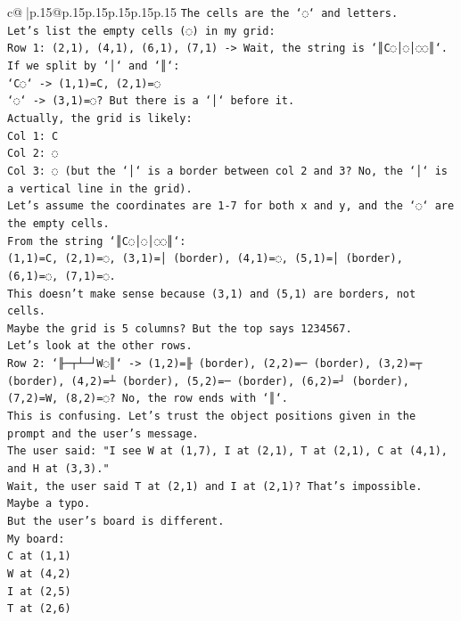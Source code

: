 \documentclass{article}
\begin{document}
{\begin{supertabular}{c@{$\;$}|p{.15\linewidth}@{}p{.15\linewidth}p{.15\linewidth}p{.15\linewidth}p{.15\linewidth}p{.15\linewidth}}
{{{\texttt{The cells are the `◌` and letters.} \\
\texttt{Let's list the empty cells (◌) in my grid:} \\
\texttt{Row 1: (2,1), (4,1), (6,1), (7,1) {-}> Wait, the string is `║C◌│◌│◌◌║`.} \\
\texttt{If we split by `│` and `║`:} \\
\texttt{`C◌` {-}> (1,1)=C, (2,1)=◌} \\
\texttt{`◌` {-}> (3,1)=◌? But there is a `│` before it.} \\
\texttt{Actually, the grid is likely:} \\
\texttt{Col 1: C} \\
\texttt{Col 2: ◌} \\
\texttt{Col 3: ◌ (but the `│` is a border between col 2 and 3? No, the `│` is a vertical line in the grid).} \\
\texttt{Let's assume the coordinates are 1{-}7 for both x and y, and the `◌` are the empty cells.} \\
\texttt{From the string `║C◌│◌│◌◌║`:} \\
\texttt{(1,1)=C, (2,1)=◌, (3,1)=│ (border), (4,1)=◌, (5,1)=│ (border), (6,1)=◌, (7,1)=◌.} \\
\texttt{This doesn't make sense because (3,1) and (5,1) are borders, not cells.} \\
\texttt{Maybe the grid is 5 columns? But the top says 1234567.} \\
\texttt{Let's look at the other rows.} \\
\texttt{Row 2: `╟─┬┴─┘W◌║` {-}> (1,2)=╟ (border), (2,2)=─ (border), (3,2)=┬ (border), (4,2)=┴ (border), (5,2)=─ (border), (6,2)=┘ (border), (7,2)=W, (8,2)=◌? No, the row ends with `║`.} \\
\texttt{This is confusing. Let's trust the object positions given in the prompt and the user's message.} \\
\texttt{The user said: "I see W at (1,7), I at (2,1), T at (2,1), C at (4,1), and H at (3,3)."} \\
\texttt{Wait, the user said T at (2,1) and I at (2,1)? That's impossible. Maybe a typo.} \\
\texttt{But the user's board is different.} \\
\texttt{My board:} \\
\texttt{C at (1,1)} \\
\texttt{W at (4,2)} \\
\texttt{I at (2,5)} \\
\texttt{T at (2,6)} \\
}}}
\end{supertabular}}
\end{document}
